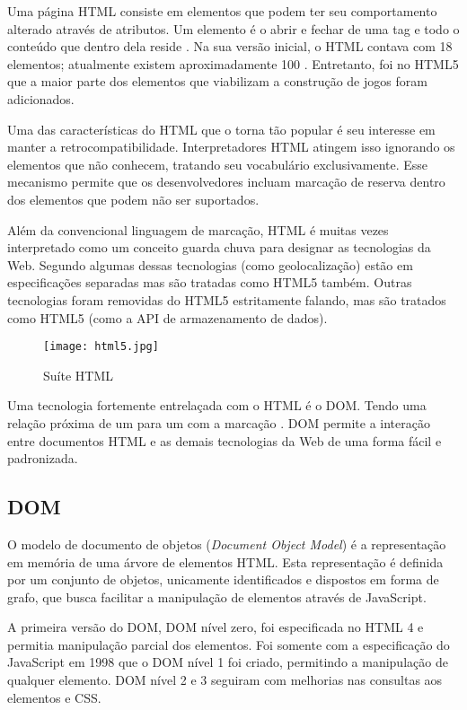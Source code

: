 Uma página HTML consiste em elementos que podem ter seu comportamento
alterado através de atributos. Um elemento é o abrir e fechar de
uma tag e todo o conteúdo que dentro dela reside \autocite[p.
10--11]{htmlAndCssDucket}. Na sua versão inicial, o HTML
contava com 18 elementos; atualmente existem aproximadamente 100
\autocite{diveIntohtml}. Entretanto, foi no HTML5 que a maior parte dos
elementos que viabilizam a construção de jogos foram adicionados.

Uma das características do HTML que o torna tão popular é seu
interesse em manter a retrocompatibilidade. Interpretadores
HTML atingem isso ignorando os elementos que não conhecem, tratando
seu vocabulário exclusivamente. Esse mecanismo permite que os
desenvolvedores incluam marcação de reserva dentro dos elementos
que podem não ser suportados.

Além da convencional linguagem de marcação, HTML é muitas vezes
interpretado como um conceito guarda chuva para designar as tecnologias
da Web. Segundo \citet{diveIntohtml} algumas dessas tecnologias (como
geolocalização) estão em especificações separadas mas são
tratadas como HTML5 também. Outras tecnologias foram removidas do
HTML5 estritamente falando, mas são tratados como HTML5 (como a API de
armazenamento de dados).

\begin{figure}[H]
    \centering
    \texttt{[image: html5.jpg]}
    \caption{Suíte HTML}
\end{figure}

Uma tecnologia fortemente entrelaçada com o HTML é o DOM.
Tendo uma relação próxima de um para um com a marcação
\autocite{howBrowsersWork}. DOM permite a interação entre documentos
HTML e as demais tecnologias da Web de uma forma fácil e padronizada.

\subsection{DOM}

O modelo de documento de objetos (\textit{Document Object Model}) é
a representação em memória de uma árvore de elementos HTML. Esta
representação é definida por um conjunto de objetos, unicamente
identificados e dispostos em forma de grafo, que busca facilitar a
manipulação de elementos através de JavaScript.

A primeira versão do DOM, DOM nível zero, foi especificada no
HTML 4 e permitia manipulação parcial dos elementos. Foi somente
com a especificação do JavaScript em 1998 que o DOM nível 1 foi
criado, permitindo a manipulação de qualquer elemento. DOM
nível 2 e 3 seguiram com melhorias nas consultas aos elementos e CSS.

